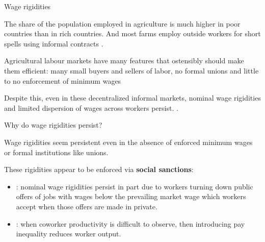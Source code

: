 \documentclass[aspectratio=169, 10pt, handout]{beamer}
\newenvironment{wideitemize}{\itemize\addtolength{\itemsep}{10pt}}{\enditemize}
\begin{document}
\begin{frame}{Wage rigidities}

\begin{wideitemize}

	\item The share of the population employed in agriculture is much higher in poor countries than in rich countries. And most farms employ outside workers for short spells using informal contracts \cite{kaur2014nominal}.

	\item Agricultural labour markets have many features that ostensibly should make them efficient: many small buyers and sellers of labor, no formal unions and little to no enforcement of minimum wages

	\item Despite this, even in these decentralized informal markets, nominal wage rigidities and limited dispersion of wages across workers persist. \citep{kaur2014nominal,breza2017morale,brezascabs}.
	
	
\end{wideitemize}

\end{frame}

\begin{frame}{Why do wage rigidities persist?}

\begin{wideitemize}

	\item Wage rigidities seem persistent even in the absence of enforced minimum wages or formal institutions like unions.

	\item These rigidities appear to be enforced via \textbf{social sanctions}:

	\begin{itemize}

		\item \cite{brezascabs}: nominal wage rigidities persist in part due to workers turning down public offers of jobs with wages below the prevailing market wage which workers accept when those offers are made in private.

		\item \cite{breza2017morale}: when coworker productivity is difficult to observe, then introducing pay inequality reduces worker output.
		
	\end{itemize}

	
\end{wideitemize}

\end{frame}
\end{document}
